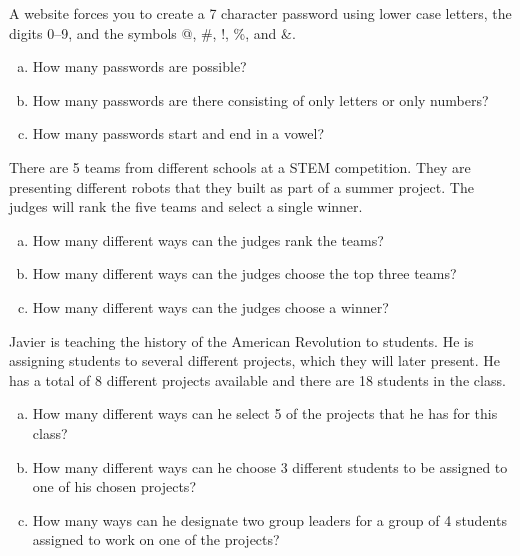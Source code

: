 \documentclass[11pt,letterpaper]{article}
\begin{document}

 A website forces you to create a 7 character password using lower case letters, the digits 0--9, and the symbols @, \#, !, \%, and \&. 
	\begin{enumerate}[(a)]
	\item How many passwords are possible?
	\item How many passwords are there consisting of only letters or only numbers?
	\item How many passwords start and end in a vowel?
	\end{enumerate}



\newpage



 There are 5 teams from different schools at a STEM competition. They are presenting different robots that they built as part of a summer project. The judges will rank the five teams and select a single winner.
	\begin{enumerate}[(a)]
	\item How many different ways can the judges rank the teams?
	\item How many different ways can the judges choose the top three teams?
	\item How many different ways can the judges choose a winner?
	\end{enumerate}



\newpage



 Javier is teaching the history of the American Revolution to students. He is assigning students to several different projects, which they will later present. He has a total of 8 different projects available and there are 18 students in the class.
	\begin{enumerate}[(a)]
	\item How many different ways can he select 5 of the projects that he has for this class?
	\item How many different ways can he choose 3 different students to be assigned to one of his chosen projects?
	\item How many ways can he designate two group leaders for a group of 4 students assigned to work on one of the projects?
	\end{enumerate}
\end{document}
